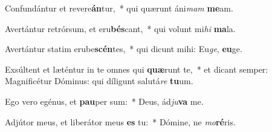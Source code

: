 \item Confundántur et revere\textbf{án}tur,~* qui quærunt áni\textit{mam} \textbf{me}am.
\item Avertántur retrórsum, et eru\textbf{bés}cant,~* qui volunt mi\textit{hi} \textbf{ma}la.
\item Avertántur statim erube\textbf{scén}tes,~* qui dicunt mihi: Eu\textit{ge}, \textbf{eu}ge.
\item Exsúltent et læténtur in te omnes qui \textbf{quæ}runt te,~* et dicant semper: Magnificétur Dóminus: qui díligunt salutá\textit{re} \textbf{tu}um.
\item Ego vero egénus, et \textbf{pau}per sum:~* Deus, ád\textit{ju}\textbf{va} me.
\item Adjútor meus, et liberátor meus \textbf{es} tu:~* Dómine, ne \textit{mo}\textbf{ré}ris.

